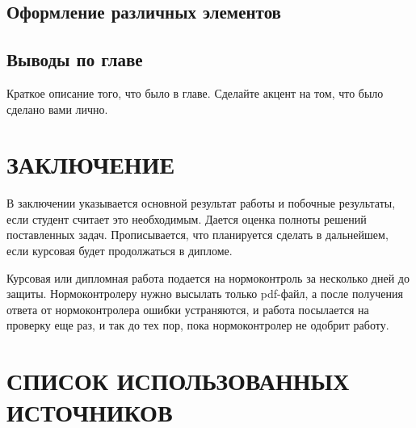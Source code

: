\documentclass{report}
\begin{document}
\section{Оформление различных элементов}

\section*{Выводы по главе}
Краткое описание того, что было в главе. Сделайте акцент на том, что было сделано вами лично.

\chapter*{ЗАКЛЮЧЕНИЕ}

В заключении указывается основной результат работы и побочные результаты, если студент считает это необходимым. Дается оценка полноты решений поставленных задач. Прописывается, что планируется сделать в дальнейшем, если курсовая будет продолжаться в дипломе. 

Курсовая или дипломная работа подается на нормоконтроль за нес\-колько дней до защиты. Нормоконтролеру нужно высылать только pdf-файл, а после получения ответа от нормоконтролера ошибки устраняются, и работа посылается на проверку еще раз, и так до тех пор, пока нормоконтролер не одобрит работу.




\chapter*{СПИСОК ИСПОЛЬЗОВАННЫХ ИСТОЧНИКОВ}
\end{document}
